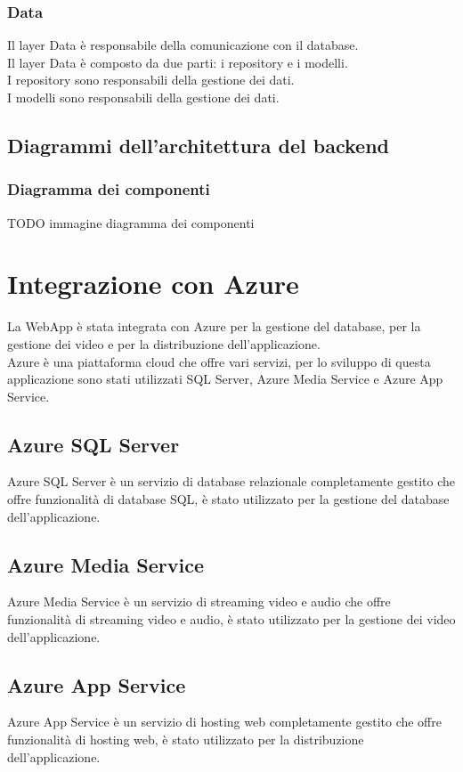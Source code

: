 \subsubsection{Data}
Il layer Data è responsabile della comunicazione con il database.\\
Il layer Data è composto da due parti: i repository e i modelli.\\
I repository sono responsabili della gestione dei dati.\\
I modelli sono responsabili della gestione dei dati.\\

\subsection{Diagrammi dell'architettura del backend}
\subsubsection{Diagramma dei componenti}

TODO immagine diagramma dei componenti

\section{Integrazione con Azure}
La WebApp è stata integrata con Azure per la gestione del database, per la gestione dei video e per la distribuzione dell'applicazione.\\
Azure è una piattaforma cloud che offre vari servizi, per lo sviluppo di questa applicazione sono stati utilizzati SQL Server, Azure Media Service e Azure App Service.\\

\subsection{Azure SQL Server}
Azure SQL Server è un servizio di database relazionale completamente gestito che offre funzionalità di database SQL, è stato utilizzato per la gestione del database dell'applicazione.\\


\subsection{Azure Media Service}
Azure Media Service è un servizio di streaming video e audio che offre funzionalità di streaming video e audio, è stato utilizzato per la gestione dei video dell'applicazione.\\


\subsection{Azure App Service}
Azure App Service è un servizio di hosting web completamente gestito che offre funzionalità di hosting web, è stato utilizzato per la distribuzione dell'applicazione.\\